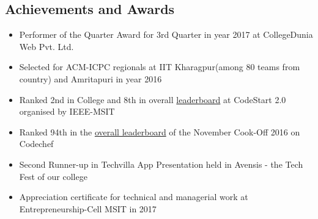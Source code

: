 \documentclass[margin, centered]{res}
\begin{document}
\begin{resume}
\section{Achievements and Awards}
\begin{itemize}[leftmargin=*]
 \item Performer of the Quarter Award for 3rd Quarter in year 2017 at CollegeDunia Web Pvt. Ltd. 
 \item Selected for ACM-ICPC regionals at IIT Kharagpur(among 80 teams from country) and Amritapuri in year 2016
 \item Ranked 2nd in College and 8th in overall \href {https://www.hackerearth.com/CodeStart2/leaderboard/}{leaderboard} at CodeStart 2.0 organised by IEEE-MSIT
 \item Ranked 94th in the \href {https://www.codechef.com/rankings/COOK76}{overall leaderboard} of the November Cook-Off 2016 on Codechef
 \item Second Runner­-up in Techvilla­ App Presentation held in Avensis - the Tech Fest of our college
 \item Appreciation certificate for technical and managerial work at Entrepreneurship-Cell MSIT in 2017
\end{itemize}



\end{resume}
\end{document}
